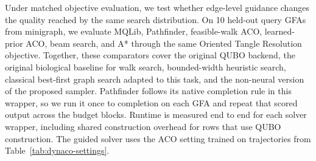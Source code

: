 \documentclass[11pt]{article}
\begin{document}
Under matched objective evaluation, we test whether edge-level guidance changes the quality reached by the same search distribution. On 10 held-out query GFAs from minigraph, we evaluate MQLib, Pathfinder, feasible-walk ACO, learned-prior ACO, beam search, and A* through the same Oriented Tangle Resolution objective. Together, these comparators cover the original QUBO backend, the original biological baseline for walk search, bounded-width heuristic search, classical best-first graph search adapted to this task, and the non-neural version of the proposed sampler. Pathfinder follows its native completion rule in this wrapper, so we run it once to completion on each GFA and repeat that scored output across the budget blocks. Runtime is measured end to end for each solver wrapper, including shared construction overhead for rows that use QUBO construction. The guided solver uses the ACO setting trained on trajectories from Table~\ref{tab:dynaco-settings}.
\end{document}
